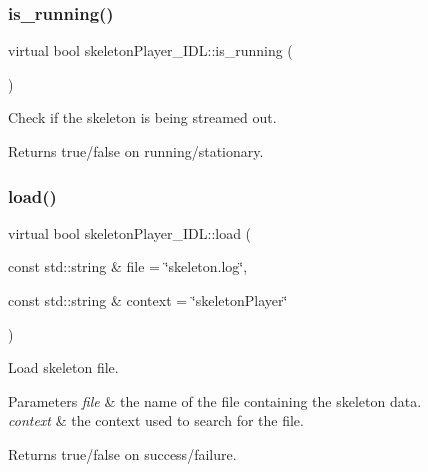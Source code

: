 \subsubsection{\texorpdfstring{is\+\_\+running()}{is\_running()}}
{\footnotesize\ttfamily virtual bool skeleton\+Player\+\_\+\+I\+D\+L\+::is\+\_\+running (\begin{DoxyParamCaption}{ }\end{DoxyParamCaption})\hspace{0.3cm}{\ttfamily [virtual]}}



Check if the skeleton is being streamed out. 

\begin{DoxyReturn}{Returns}
true/false on running/stationary. 
\end{DoxyReturn}
\mbox{\label{classskeletonPlayer__IDL_ac34bafdeb8df497435c9c3da9d8dee5b}} 
\subsubsection{\texorpdfstring{load()}{load()}}
{\footnotesize\ttfamily virtual bool skeleton\+Player\+\_\+\+I\+D\+L\+::load (\begin{DoxyParamCaption}\item[{const std\+::string \&}]{file = {\ttfamily \char`\"{}skeleton.log\char`\"{}},  }\item[{const std\+::string \&}]{context = {\ttfamily \char`\"{}skeletonPlayer\char`\"{}} }\end{DoxyParamCaption})\hspace{0.3cm}{\ttfamily [virtual]}}



Load skeleton file. 


\begin{DoxyParams}{Parameters}
{\em file} & the name of the file containing the skeleton data. \\
\hline
{\em context} & the context used to search for the file. \\
\hline
\end{DoxyParams}
\begin{DoxyReturn}{Returns}
true/false on success/failure. 
\end{DoxyReturn}
\mbox{\label{classskeletonPlayer__IDL_a0419e3b52e359f4b1fe9c8efba2db38e}} 
